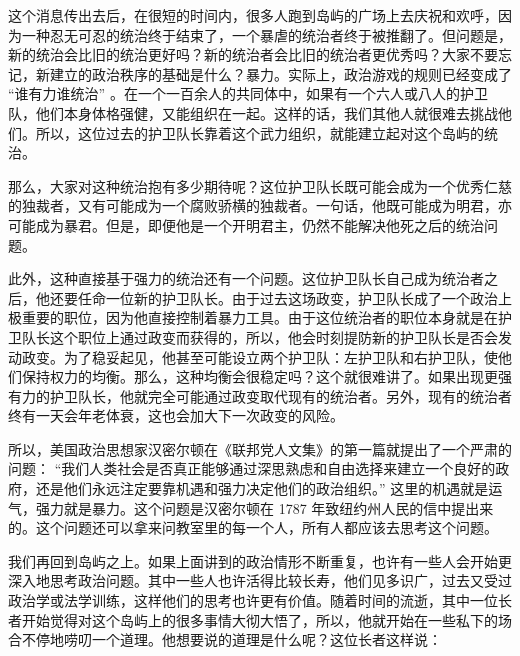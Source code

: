这个消息传出去后，在很短的时间内，很多人跑到岛屿的广场上去庆祝和欢呼，因为一种忍无可忍的统治终于结束了，一个暴虐的统治者终于被推翻了。但问题是，新的统治会比旧的统治更好吗？新的统治者会比旧的统治者更优秀吗？大家不要忘记，新建立的政治秩序的基础是什么？暴力。实际上，政治游戏的规则已经变成了 “谁有力谁统治” 。在一个一百余人的共同体中，如果有一个六人或八人的护卫队，他们本身体格强健，又能组织在一起。这样的话，我们其他人就很难去挑战他们。所以，这位过去的护卫队长靠着这个武力组织，就能建立起对这个岛屿的统治。

那么，大家对这种统治抱有多少期待呢？这位护卫队长既可能会成为一个优秀仁慈的独裁者，又有可能成为一个腐败骄横的独裁者。一句话，他既可能成为明君，亦可能成为暴君。但是，即便他是一个开明君主，仍然不能解决他死之后的统治问题。

此外，这种直接基于强力的统治还有一个问题。这位护卫队长自己成为统治者之后，他还要任命一位新的护卫队长。由于过去这场政变，护卫队长成了一个政治上极重要的职位，因为他直接控制着暴力工具。由于这位统治者的职位本身就是在护卫队长这个职位上通过政变而获得的，所以，他会时刻提防新的护卫队长是否会发动政变。为了稳妥起见，他甚至可能设立两个护卫队：左护卫队和右护卫队，使他们保持权力的均衡。那么，这种均衡会很稳定吗？这个就很难讲了。如果出现更强有力的护卫队长，他就完全可能通过政变取代现有的统治者。另外，现有的统治者终有一天会年老体衰，这也会加大下一次政变的风险。

所以，美国政治思想家汉密尔顿在《联邦党人文集》的第一篇就提出了一个严肃的问题： “我们人类社会是否真正能够通过深思熟虑和自由选择来建立一个良好的政府，还是他们永远注定要靠机遇和强力决定他们的政治组织。” 这里的机遇就是运气，强力就是暴力。这个问题是汉密尔顿在 1787 年致纽约州人民的信中提出来的。这个问题还可以拿来问教室里的每一个人，所有人都应该去思考这个问题。

我们再回到岛屿之上。如果上面讲到的政治情形不断重复，也许有一些人会开始更深入地思考政治问题。其中一些人也许活得比较长寿，他们见多识广，过去又受过政治学或法学训练，这样他们的思考也许更有价值。随着时间的流逝，其中一位长者开始觉得对这个岛屿上的很多事情大彻大悟了，所以，他就开始在一些私下的场合不停地唠叨一个道理。他想要说的道理是什么呢？这位长者这样说：


